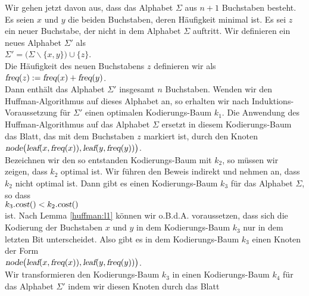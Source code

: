 \begin{enumerate}
  Wir gehen jetzt davon aus, dass das Alphabet $\Sigma$ aus $n+1$ Buchstaben besteht.
  Es seien $x$ und $y$ die beiden Buchstaben, deren H\"aufigkeit minimal ist.
  Es sei $z$ ein neuer Buchstabe, der nicht in dem Alphabet $\Sigma$ auftritt.  Wir definieren
  ein neues Alphabet $\Sigma'$ als
  \\[0.2cm]
  \hspace*{1.3cm}
  $\Sigma' = \bigl(\Sigma \backslash \{x,y\}\bigr) \cup \{z\}$.
  \\[0.2cm]
  Die H\"aufigkeit des neuen Buchstabens $z$ definieren wir als 
  \\[0.2cm]
  \hspace*{1.3cm}
  $\textsl{freq}(z) := \textsl{freq}(x) + \textsl{freq}(y)$.
  \\[0.2cm]
  Dann enth\"alt das Alphabet $\Sigma'$ insgesamt $n$ Buchstaben.  Wenden wir den Huffman-Algorithmus
  auf dieses Alphabet an, so erhalten wir nach Induktions-Voraussetzung f\"ur $\Sigma'$ einen optimalen
  Kodierungs-Baum $k_1$.  Die Anwendung des Huffman-Algorithmus auf das Alphabet $\Sigma$ ersetzt in diesem
  Kodierungs-Baum das Blatt, das mit dem Buchstaben $z$ markiert ist, durch den Knoten 
  \\[0.2cm]
  \hspace*{1.3cm}
  $\textsl{node}\bigl(\textsl{leaf}(x, \textsl{freq}(x)), \textsl{leaf}(y,\textsl{freq}(y))\bigr)$.
  \\[0.2cm]
  Bezeichnen wir den so entstanden Kodierungs-Baum mit $k_2$, so m\"ussen wir zeigen, dass $k_2$ optimal
  ist.  Wir f\"uhren den Beweis indirekt und nehmen an, dass $k_2$ nicht optimal ist. Dann gibt es einen
  Kodierungs-Baum $k_3$ f\"ur das Alphabet $\Sigma$, so dass 
  \\[0.2cm]
  \hspace*{1.3cm}
  $k_3.\textsl{cost}() < k_2.\textsl{cost}()$
  \\[0.2cm]
  ist.  Nach Lemma \ref{huffman:l1} k\"onnen wir o.B.d.A. voraussetzen, dass sich die Kodierung der 
  Buchstaben $x$ und $y$ in dem Kodierungs-Baum $k_3$ nur in dem letzten Bit
  unterscheidet.  Also gibt es in dem Kodierungs-Baum $k_3$ einen Knoten der Form
  \\[0.2cm]
  \hspace*{1.3cm}
  $\textsl{node}\bigl(\textsl{leaf}(x, \textsl{freq}(x)), \textsl{leaf}(y,\textsl{freq}(y))\bigr)$.
  \\[0.2cm]
  Wir transformieren den Kodierungs-Baum $k_3$ in einen Kodierungs-Baum $k_4$ f\"ur das Alphabet $\Sigma'$ indem
  wir diesen Knoten durch das Blatt

\end{enumerate}
